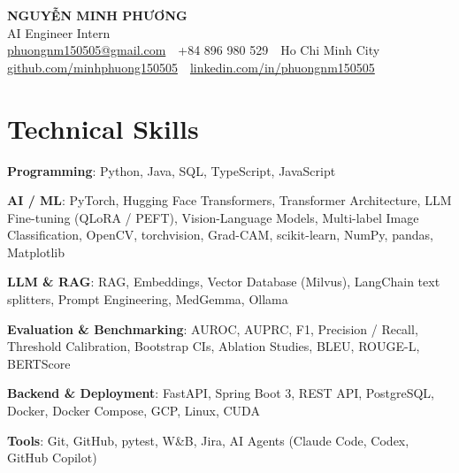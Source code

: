 \documentclass[10pt, a4paper]{article}
\newcommand{\skillrow}[2]{\textbf{#1}: #2\par}
\begin{document}
\color{BodyText}

\begin{center}
  {\fontsize{21pt}{25pt}\selectfont\bfseries\color{NavyBlue} NGUYỄN MINH PHƯƠNG}\\[3pt]
  {\fontsize{12.5pt}{15pt}\selectfont\color{MutedText} AI Engineer Intern }\\[4pt]
  {\footnotesize
  \href{mailto:phuongnm150505@gmail.com}{phuongnm150505@gmail.com}
  \,\textbar\, +84 896 980 529
  \,\textbar\, Ho Chi Minh City
  \,\textbar\, \href{https://github.com/minhphuong150505}{github.com/minhphuong150505}
  \,\textbar\, \href{https://www.linkedin.com/in/phuongnm150505/}{linkedin.com/in/phuongnm150505}}
\end{center}
\vspace{-6pt}

\section{Technical Skills}
\skillrow{Programming}{Python, Java, SQL, TypeScript, JavaScript}
\skillrow{AI / ML}{PyTorch, Hugging Face Transformers, Transformer Architecture, LLM Fine-tuning (QLoRA / PEFT), Vision-Language Models, Multi-label Image Classification, OpenCV, torchvision, Grad-CAM, scikit-learn, NumPy, pandas, Matplotlib}
\skillrow{LLM \& RAG}{RAG, Embeddings, Vector Database (Milvus), LangChain text splitters, Prompt Engineering, MedGemma, Ollama}
\skillrow{Evaluation \& Benchmarking}{AUROC, AUPRC, F1, Precision / Recall, Threshold Calibration, Bootstrap CIs, Ablation Studies, BLEU, ROUGE-L, BERTScore}
\skillrow{Backend \& Deployment}{FastAPI, Spring Boot 3, REST API, PostgreSQL, Docker, Docker Compose, GCP, Linux, CUDA}
\skillrow{Tools}{Git, GitHub, pytest, W\&B, Jira, AI Agents (Claude Code, Codex, GitHub Copilot)}

\end{document}
